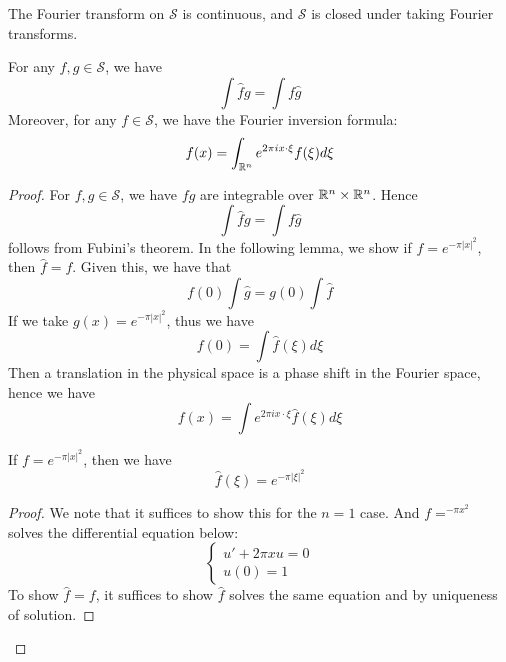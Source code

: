 \begin{theorem}
    The Fourier transform on $\mathcal{S}$ is continuous, and $\mathcal{S}$ is closed under taking Fourier transforms.

    For any $f,g\in\mathcal{S}$, we have
    \begin{equation*}
        \int\hat{f}g=\int f\hat{g}
    \end{equation*}
    Moreover, for any $f\in\mathcal{S}$, we have the Fourier inversion formula:
    \begin{equation*}
        f(x)=\int_{\mathbb{R}^n} e^{2\pi ix\cdot\xi}f(\xi)d\xi
    \end{equation*}
\end{theorem}
\begin{proof}
    For $f,g\in\mathcal{S}$, we have $fg$ are integrable over $\mathbb{R}^n\times\mathbb{R}^n$. Hence
    \begin{equation*}
        \int\hat{f}g=\int f\hat{g}
    \end{equation*}
    follows from Fubini's theorem.
    In the following lemma, we show if $f=e^{-\pi|x|^2}$, then $\hat{f}=f$. Given this, we have that
    \begin{equation*}
        f(0)\int \hat{g}=g(0)\int\hat{f}
    \end{equation*}
    If we take $g(x)=e^{-\pi|x|^2}$, thus we have
    \begin{equation*}
        f(0)=\int\hat{f}(\xi)d\xi
    \end{equation*}
    Then a translation in the physical space is a phase shift in the Fourier space, hence we have
    \begin{equation*}
        f(x)=\int e^{2\pi ix\cdot\xi}\hat{f}(\xi)d\xi
    \end{equation*}
    \begin{lemma}
       If $f=e^{-\pi|x|^2}$, then we have
       \begin{equation*}
        \hat{f}(\xi)=e^{-\pi|\xi|^2}
       \end{equation*}
    \end{lemma}
    \begin{proof}
        We note that it suffices to show this for the $n=1$ case. And $f=^{-\pi x^2}$ solves the differential equation below:
        \begin{equation*}
            \begin{cases}
                u'+2\pi xu=0\\
                u(0)=1
            \end{cases}
        \end{equation*}
        To show $\hat{f}=f$, it suffices to show $\hat{f}$ solves the same equation and by uniqueness of solution.


\end{proof}
\end{proof}
